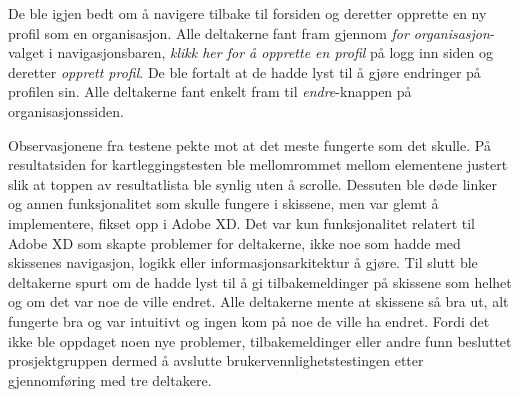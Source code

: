 De ble igjen bedt om å navigere tilbake til forsiden og deretter opprette en ny profil som en organisasjon. Alle deltakerne fant fram gjennom {\em for organisasjon}-valget i navigasjonsbaren, {\em klikk her for å opprette en profil} på logg inn siden og deretter {\em opprett profil}. De ble fortalt at de hadde lyst til å gjøre endringer på profilen sin. Alle deltakerne fant enkelt fram til {\em endre}-knappen på organisasjonssiden.

Observasjonene fra testene pekte mot at det meste fungerte som det skulle. På resultatsiden for kartleggingstesten ble mellomrommet mellom elementene justert slik at toppen av resultatlista ble synlig uten å scrolle. Dessuten ble døde linker og annen funksjonalitet som skulle fungere i skissene, men var glemt å implementere, fikset opp i Adobe XD. Det var kun funksjonalitet relatert til Adobe XD som skapte problemer for deltakerne, ikke noe som hadde med skissenes navigasjon, logikk eller informasjonsarkitektur å gjøre. Til slutt ble deltakerne spurt om de hadde lyst til å gi tilbakemeldinger på skissene som helhet og om det var noe de ville endret. Alle deltakerne mente at skissene så bra ut, alt fungerte bra og var intuitivt og ingen kom på noe de ville ha endret. Fordi det ikke ble oppdaget noen nye problemer, tilbakemeldinger eller andre funn besluttet prosjektgruppen dermed å avslutte brukervennlighetstestingen etter gjennomføring med tre deltakere.

